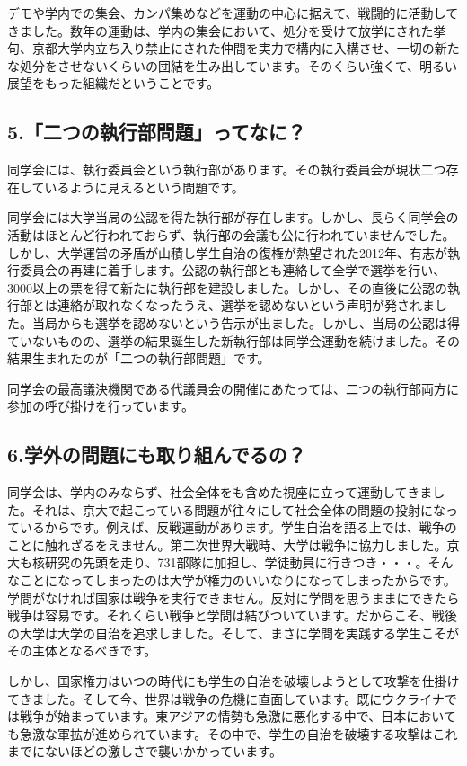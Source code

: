 デモや学内での集会、カンパ集めなどを運動の中心に据えて、戦闘的に活動してきました。数年の運動は、学内の集会において、処分を受けて放学にされた挙句、京都大学内立ち入り禁止にされた仲間を実力で構内に入構させ、一切の新たな処分をさせないくらいの団結を生み出しています。そのくらい強くて、明るい展望をもった組織だということです。

\subsection{5.「二つの執行部問題」ってなに？}
同学会には、執行委員会という執行部があります。その執行委員会が現状二つ存在しているように見えるという問題です。

同学会には大学当局の公認を得た執行部が存在します。しかし、長らく同学会の活動はほとんど行われておらず、執行部の会議も公に行われていませんでした。しかし、大学運営の矛盾が山積し学生自治の復権が熱望された2012年、有志が執行委員会の再建に着手します。公認の執行部とも連絡して全学で選挙を行い、3000以上の票を得て新たに執行部を建設しました。しかし、その直後に公認の執行部とは連絡が取れなくなったうえ、選挙を認めないという声明が発されました。当局からも選挙を認めないという告示が出ました。しかし、当局の公認は得ていないものの、選挙の結果誕生した新執行部は同学会運動を続けました。その結果生まれたのが「二つの執行部問題」です。

同学会の最高議決機関である代議員会の開催にあたっては、二つの執行部両方に参加の呼び掛けを行っています。

\subsection{6.学外の問題にも取り組んでるの？}
同学会は、学内のみならず、社会全体をも含めた視座に立って運動してきました。それは、京大で起こっている問題が往々にして社会全体の問題の投射になっているからです。例えば、反戦運動があります。学生自治を語る上では、戦争のことに触れざるをえません。第二次世界大戦時、大学は戦争に協力しました。京大も核研究の先頭を走り、731部隊に加担し、学徒動員に行きつき・・・。そんなことになってしまったのは大学が権力のいいなりになってしまったからです。学問がなければ国家は戦争を実行できません。反対に学問を思うままにできたら戦争は容易です。それくらい戦争と学問は結びついています。だからこそ、戦後の大学は大学の自治を追求しました。そして、まさに学問を実践する学生こそがその主体となるべきです。

しかし、国家権力はいつの時代にも学生の自治を破壊しようとして攻撃を仕掛けてきました。そして今、世界は戦争の危機に直面しています。既にウクライナでは戦争が始まっています。東アジアの情勢も急激に悪化する中で、日本においても急激な軍拡が進められています。その中で、学生の自治を破壊する攻撃はこれまでにないほどの激しさで襲いかかっています。

